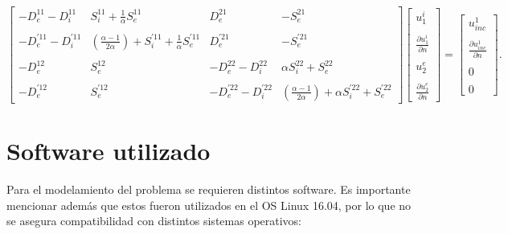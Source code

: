 \documentclass[12pt,letterpaper]{report}
\numberwithin{equation}{section}
\begin{document}
\begin{equation} 
\begin{bmatrix}
-D_{e}^{11} - D_{i}^{11} & S_{i}^{11} + \frac{1}{\alpha}S_{e}^{11} & D_{e}^{21} & -S_{e}^{21} \\
\\
-D_{e}^{'11} - D_{i}^{'11} & (\frac{\alpha - 1}{2\alpha})+ S_{i}^{'11} + \frac{1}{\alpha}S_{e}^{'11} & D_{e}^{'21} & -S_{e}^{'21}\\
\\
-D_{e}^{12} & S_{e}^{12} & -D_{e}^{22} - D_{i}^{22} & \alpha S_{i}^{22} + S_{e}^{22}\\
\\
-D_{e}^{'12} & S_{e}^{'12} & -D_{e}^{'22} - D_{i}^{'22} & (\frac{\alpha - 1}{2\alpha})+\alpha S_{i}^{'22} + S_{e}^{'22}
\end{bmatrix}
\begin{bmatrix}
u^{i}_1\\
\\
\frac{\partial u^{i}_1}{\partial n}\\
\\
u^{e}_2\\
\\
\frac{\partial u^{e}_2}{\partial n}
\end{bmatrix}
=
\begin{bmatrix}
u_{inc}^1\\
\\
\frac{\partial u_{inc}^1}{\partial n}\\
\\
0\\
\\
0
\end{bmatrix}.
\label{eq:multi2_matriz int}		 
\end{equation} 


\chapter{Software utilizado}

Para el modelamiento del problema se requieren distintos software. Es importante mencionar además que estos fueron utilizados en el OS Linux 16.04, por lo que no se asegura compatibilidad con distintos sistemas operativos:
\end{document}
